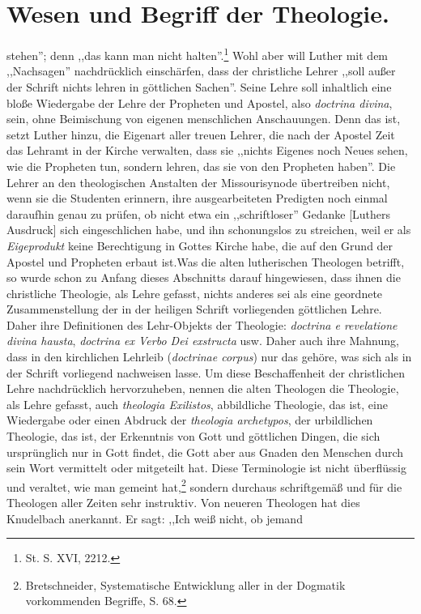 \setcounter{page}{63}\section*{Wesen und Begriff der Theologie.}stehen''; denn ,,das kann man nicht halten''.\footnote{St. S. XVI, 2212.} Wohl aber will Luther mit dem ,,Nachsagen'' nachdrücklich einschärfen, dass der christliche Lehrer ,,soll außer der Schrift nichts lehren in göttlichen Sachen''. Seine Lehre soll inhaltlich eine bloße Wiedergabe der Lehre der Propheten und Apostel, also \textit{doctrina divina}, sein, ohne Beimischung von eigenen menschlichen Anschauungen. Denn das ist, setzt Luther hinzu, die Eigenart aller treuen Lehrer, die nach der Apostel Zeit das Lehramt in der Kirche verwalten, dass sie ,,nichts Eigenes noch Neues sehen, wie die Propheten tun, sondern lehren, das sie von den Propheten haben''. Die Lehrer an den theologischen Anstalten der Missourisynode übertreiben nicht, wenn sie die Studenten erinnern, ihre ausgearbeiteten Predigten noch einmal daraufhin genau zu prüfen, ob nicht etwa ein ,,schriftloser'' Gedanke [Luthers Ausdruck] sich eingeschlichen habe, und ihn schonungslos zu streichen, weil er als \textit{Eigeprodukt} keine Berechtigung in Gottes Kirche habe, die auf den Grund der Apostel und Propheten erbaut ist.Was die alten lutherischen Theologen betrifft, so wurde schon zu Anfang dieses Abschnitts darauf hingewiesen, dass ihnen die christliche Theologie, als Lehre gefasst, nichts anderes sei als eine geordnete Zusammenstellung der in der heiligen Schrift vorliegenden göttlichen Lehre. Daher ihre Definitionen des Lehr-Objekts der Theologie: \textit{doctrina e revelatione divina hausta}, \textit{doctrina ex Verbo Dei exstructa} usw. Daher auch ihre Mahnung, dass in den kirchlichen Lehrleib (\textit{doctrinae corpus}) nur das gehöre, was sich als in der Schrift vorliegend nachweisen lasse. Um diese Beschaffenheit der christlichen Lehre nachdrücklich hervorzuheben, nennen die alten Theologen die Theologie, als Lehre gefasst, auch \textit{theologia \textgreek{Exilistos}}, abbildliche Theologie, das ist, eine Wiedergabe oder einen Abdruck der \textit{theologia \textgreek{archetypos}}, der urbildlichen Theologie, das ist, der Erkenntnis von Gott und göttlichen Dingen, die sich ursprünglich nur in Gott findet, die Gott aber aus Gnaden den Menschen durch sein Wort vermittelt oder mitgeteilt hat. Diese Terminologie ist nicht überflüssig und veraltet, wie man gemeint hat,\footnote{Bretschneider, Systematische Entwicklung aller in der Dogmatik vorkommenden Begriffe, S. 68.} sondern durchaus schriftgemäß und für die Theologen aller Zeiten sehr instruktiv. Von neueren Theologen hat dies Knudelbach anerkannt. Er sagt: ,,Ich weiß nicht, ob jemand